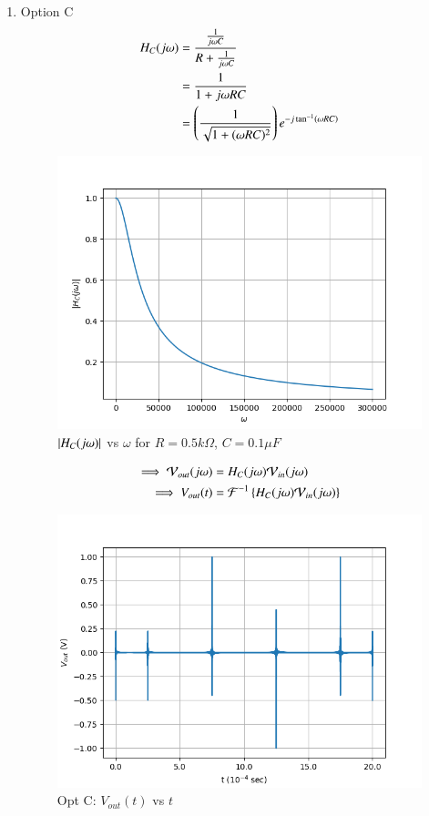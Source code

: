 \documentclass[journal,12pt,twocolumn]{IEEEtran}
\theoremstyle{remark}
\begin{document}
\begin{enumerate}
    \item Option C
    \begin{align}
        H_C(j\omega) &=  \frac{\frac{1}{j\omega C}}{R + \frac{1}{j\omega C}}\\
        &= \frac{1}{1+j\omega RC}\\
        &= \left(\frac{1}{\sqrt{1 + (\omega R C)^2}}\right)e^{-j\tan^{-1}\left(\omega RC\right)}
    \end{align}
    \begin{figure}[!h]
        \centering
        \includegraphics[width=\columnwidth]{figs/opt_c_hf.png}
        \caption{$\left\vert H_C(j\omega)\right\vert$ vs $\omega$ for $R=0.5k\Omega$, $C=0.1\mu F$}
        \label{fig:opt_c_hf_gate.ph.23.37}
    \end{figure}
    \begin{align}
        \implies \mathcal{V}_{out}(j\omega) &= H_C(j\omega)\mathcal{V}_{in}(j\omega)\\
        \implies V_{out}(t) &= \mathcal{F}^{-1}\left\{H_C(j\omega)\mathcal{V}_{in}(j\omega)\right\}
    \end{align}
    \begin{figure}[!h]
        \centering
        \includegraphics[width = \columnwidth]{figs/opt_c_res.png}
        \caption{Opt C: $V_{out}(t)$ vs $t$}
        \label{fig:opt_c_res_gate.23.ph.37}
    \end{figure}
    

\end{enumerate}
\end{document}
